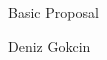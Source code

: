 \documentclass[a4paper]{article}
\begin{document}

\Large
\begin{center}
    Basic Proposal\\ 

    \hspace{10pt}

    \large
    Deniz Gokcin\\

    \hspace{10pt}

\end{center}

\hspace{10pt}

\normalsize

\lipsum[1-1]
\end{document}
